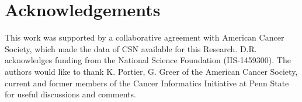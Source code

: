 \documentclass[man,biblatex,floatsintext]{apa6}
\begin{document}

\section*{Acknowledgements}
This work was supported by a collaborative agreement with
American Cancer Society, which made the data of CSN available for this Research. D.R. acknowledges funding from the National Science Foundation (IIS-1459300). The authors would like to thank K. Portier, G. Greer of the
American Cancer Society, current and former members of the Cancer
Informatics Initiative at Penn State for useful discussions and comments.



\printbibliography
\end{document}
